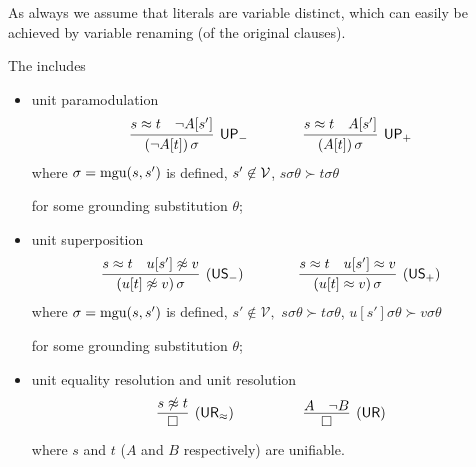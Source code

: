 
As always we assume that literals are variable distinct, 
	which can easily be achieved by variable renaming (of the original clauses).


\begin{definition}\label{def:unit-superpositin-calculus} 
	The  \cite{GK2004csl} includes
	\begin{itemize}
		\item unit paramodulation
		\begin{gather*}
		\infer
		[\mathsf{UP_-}]
		{(\lnot A[t])\,\sigma}
		{s\mEQ t&\lnot A[s']}
		\qquad\qquad
		\infer
		[\mathsf{UP_+}]
		{(A[t])\,\sigma}
		{s\mEQ t&A[s']}
		\end{gather*}
		where \( \sigma=\operatorname{mgu}(s,s') \) is defined,
		\( s'\not\in\mathcal{V} \),
		\( s\sigma\theta\succ t\sigma\theta \)

		for some grounding substitution \( \theta \);

		\item unit superposition
		\begin{gather*}
		\infer
		[\mathsf{(US_-)}]
		{(u[t]\mNE v)\,\sigma}
		{s\mEQ t&u[s']\mNE v}
		\qquad\qquad
		\infer
		[\mathsf{(US_+)}]
		{(u[t]\mEQ v)\,\sigma}
		{s\mEQ t&u[s']\mEQ v}
		\end{gather*}
		where \( \sigma=\operatorname{mgu}(s,s') \) is defined,
		\( s'\not\in\mathcal{V}, \)
		\( s\sigma\theta\succ t\sigma\theta \),
		\( u[s']\sigma\theta\succ v\sigma\theta \)

		for some grounding substitution \( \theta \);
		\item unit equality resolution and unit resolution
		\begin{gather*}
		\infer
		[\mathsf{(UR_\mEQ)}]
		{\emptyclause}
		{s\mNE t}
		\quad\quad\quad\qquad
		\infer
		[\mathsf{(UR)}]
		{\emptyclause}
		{A&\lnot B}
		\end{gather*}
		where \( s \) and \( t \) (\( A \) and \( B \) respectively) are unifiable.
	\end{itemize}
\end{definition}